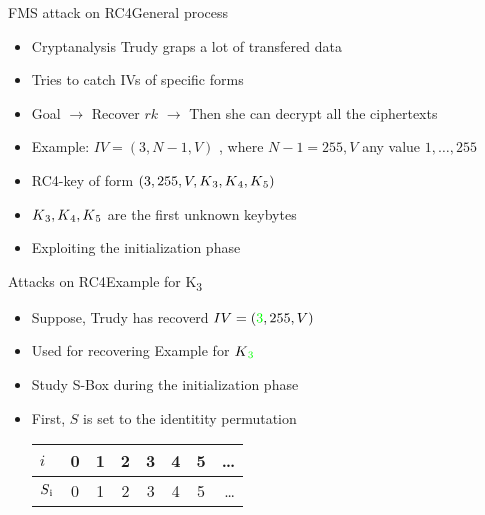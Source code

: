\documentclass[
	aspectratio=169,	%
	onlytextwidth,		%
	t,					%
	]{beamer}
\begin{document}
\begin{frame}[fragile]{FMS attack on RC4}{General process}
	\begin{itemize}
		\item Cryptanalysis Trudy graps a lot of transfered data
		\item Tries to catch IVs of specific forms 
		\item Goal $\rightarrow$ Recover $rk$ $\rightarrow$ Then she can decrypt all the ciphertexts
		\item Example: $ IV = (3, N-1, V)$ , where $N-1 = 255, V$ any value ${1,\dots,255}$
		\item RC4-key of form $(3, 255, V, K\textsubscript{3}, K\textsubscript{4},K\textsubscript{5})$
		\item $K\textsubscript{3}, K\textsubscript{4},K\textsubscript{5}$ are the first unknown keybytes
		\item Exploiting the initialization phase
	\end{itemize}
\end{frame}

\begin{frame}[fragile]{Attacks on RC4}{Example for K\textsubscript{3}}
	\begin{itemize}
		\item Suppose, Trudy has recoverd $IV = (\textcolor{green}{3}, 255, V)$ 
		\item Used for recovering Example for $K\textsubscript{\textcolor{green}{3}}$
		\item Study S-Box during the initialization phase
		\item First, $S$ is set to the identitity permutation
		\medskip
		\begin{table}[h!]
			\begin{center}
			  \begin{tabular}{l|c|c|c|c|c|c|r}
				$i$ & 0 & 1 & 2 & 3 & 4 & 5 & \dots\\
				\hline
				$S\textsubscript{i}$ & 0 & 1 & 2 & 3 & 4 & 5 & \dots\\
			  \end{tabular}
			\end{center}
		  \end{table}

	\end{itemize}
\end{frame}
\end{document}
